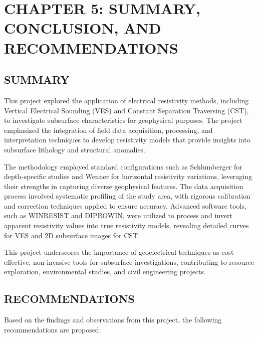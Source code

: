 \documentclass[12pt,a4paper]{report}
\begin{document}
\chapter{CHAPTER 5: SUMMARY, CONCLUSION, AND RECOMMENDATIONS}

\section{SUMMARY}

This project explored the application of electrical resistivity methods, including Vertical Electrical Sounding (VES) and Constant Separation Traversing (CST), to investigate subsurface characteristics for geophysical purposes. The project emphasized the integration of field data acquisition, processing, and interpretation techniques to develop resistivity models that provide insights into subsurface lithology and structural anomalies.

The methodology employed standard configurations such as Schlumberger for depth-specific studies and Wenner for horizontal resistivity variations, leveraging their strengths in capturing diverse geophysical features. The data acquisition process involved systematic profiling of the study area, with rigorous calibration and correction techniques applied to ensure accuracy. Advanced software tools, such as WINRESIST and DIPROWIN, were utilized to process and invert apparent resistivity values into true resistivity models, revealing detailed curves for VES and 2D subsurface images for CST.

This project underscores the importance of geoelectrical techniques as cost-effective, non-invasive tools for subsurface investigations, contributing to resource exploration, environmental studies, and civil engineering projects.

\section{RECOMMENDATIONS}

Based on the findings and observations from this project, the following recommendations are proposed:
\end{document}
